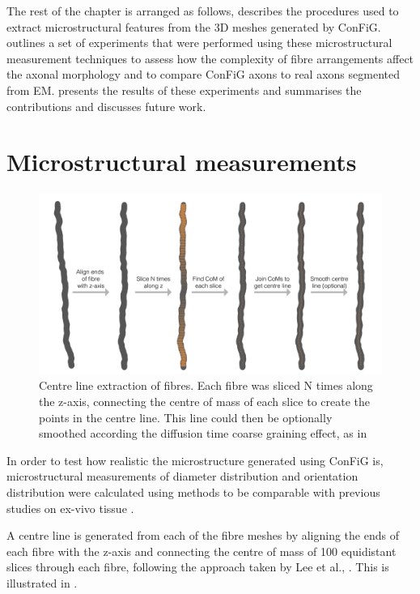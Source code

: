 The rest of the chapter is arranged as follows,  describes the procedures used to extract microstructural features from the 3D meshes generated by \ac{ConFiG}.~ outlines a set of experiments that were performed using these microstructural measurement techniques to assess how the complexity of fibre arrangements affect the axonal morphology and to compare \ac{ConFiG} axons to real axons segmented from \ac{EM}.  presents the results of these experiments and  summarises the contributions and discusses future work.


\section{Microstructural measurements}
\label{sec:micro_measurements}

\begin{figure}
  \centering
  \includegraphics[width=\textwidth]{figures/config/centre_line_extraction-01.png}
  \caption[Mesh centreline extraction]{Centre line extraction of fibres. Each fibre was sliced N times along the z-axis, connecting the centre of mass of each slice to create the points in the centre line. This line could then be optionally smoothed according the diffusion time coarse graining effect, as in \cite{Lee2019b}}
  \label{fig:config_micro_centreline}
\end{figure}

In order to test how realistic the microstructure generated using \ac{ConFiG} is, microstructural measurements of diameter distribution and orientation distribution were calculated using methods to be comparable with previous studies on ex-vivo tissue \cite{Abdollahzadeh2019,Lee2019b}.

A centre line is generated from each of the fibre meshes by aligning the ends of each fibre with the z-axis and connecting the centre of mass of 100 equidistant slices through each fibre, following the approach taken by Lee et al., \cite{Lee2019b}. This is illustrated in .

